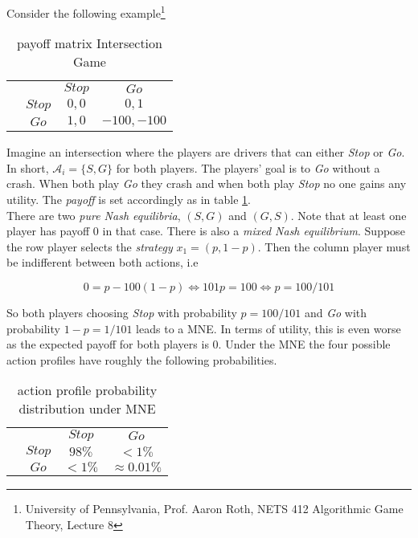 Consider the following example\footnote{University of Pennsylvania, Prof. Aaron Roth, NETS 412 Algorithmic Game Theory, Lecture 8}

\begin{table}[H]\centering
\setlength{\extrarowheight}{2pt}
\begin{tabular}{cc|c|c|}
  & \multicolumn{1}{c}{} & \multicolumn{1}{c}{$Stop$}  & \multicolumn{1}{c}{$Go$} \\\cline{3-4}
  & $Stop$ & $0,0$ & $0,1$ \\\cline{3-4}
  & $Go$ & $1,0$ & $-100,-100$ \\\cline{3-4}
\end{tabular}\caption{\label{tab:payoffIntersectionfromFiniteGames}payoff matrix Intersection Game}
\end{table}

Imagine an intersection where the players are drivers that can either \textit{Stop} or \textit{Go}. In short, $\mathcal{A}_i = \{S,G\}$ for both players. The players' goal is to \textit{Go} without a crash. When both play \textit{Go} they crash and when both play \textit{Stop} no one gains any utility. The \textit{payoff} is set accordingly as in table \ref{tab:payoffIntersectionfromFiniteGames}. \\

There are two \textit{pure Nash equilibria}, $(S,G)$ and $(G,S)$. Note that at least one player has payoff $0$ in that case. There is also a \textit{mixed Nash equilibrium}. Suppose the row player selects the \textit{strategy} $x_1 = (p,1-p)$. Then the column player must be indifferent between both actions, i.e 

\begin{equation*}
    0 = p - 100(1-p) \iff 101p = 100 \iff p = 100/101
\end{equation*}

So both players choosing \textit{Stop} with probability $p = 100/101$ and \textit{Go} with probability $1-p = 1/101$  leads to a MNE. In terms of utility, this is even worse as the expected payoff for both players is $0$. Under the MNE the four possible action
profiles have roughly the following probabilities. 

\begin{table}[H]\centering
\setlength{\extrarowheight}{2pt}
\begin{tabular}{cc|c|c|}
  & \multicolumn{1}{c}{} & \multicolumn{1}{c}{$Stop$}  & \multicolumn{1}{c}{$Go$} \\\cline{3-4}
  & $Stop$ & $98\%$ & $<1\%$ \\\cline{3-4}
  & $Go$ & $<1\%$ & $\approx 0.01\%$ \\\cline{3-4}
\end{tabular}\caption{\label{tab:probabilityUnderMNE}action profile probability distribution under MNE}
\end{table}

